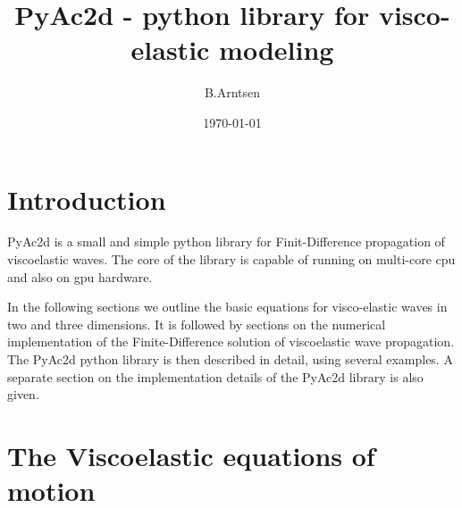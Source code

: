 \documentclass[11pt]{article}
\begin{document}
  
%
\newcommand{\dt}[1]{\partial_t{#1}}
\newcommand{\ddt}[1]{\partial^2_t{#1}}
\newcommand{\dddt}[1]{\partial^3_t{#1}}
\newcommand{\inv}[1]{\frac{1}{#1}}
\newcommand{\diff}[1]{D^+_{#1}}
\newcommand{\difb}[1]{D^-_{#1}}
\title{PyAc2d - python library for visco-elastic modeling} 
       
\author{B.Arntsen}
\date{\today}
\maketitle
\tableofcontents
\clearpage
\section{Introduction} 
PyAc2d is a small and simple python library for Finit-Difference 
propagation of viscoelastic waves. The core of the library is 
capable of running on
multi-core cpu and also on gpu hardware.

In the following sections we outline the basic equations 
for visco-elastic waves in two and three dimensions.
It is followed by sections on the numerical implementation of 
the Finite-Difference
solution of viscoelastic wave propagation.
The PyAc2d python library is then described in detail, using several
examples. 
A separate section on the implementation details of 
the PyAc2d library is also given.

\section{The Viscoelastic equations of motion} 
\end{document}

